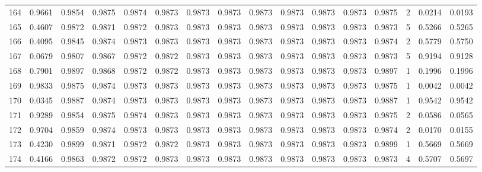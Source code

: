 \begin{tabular}{lrrrrrrrrrrrrrrr}
164 &      0.9661 &  0.9854 &  0.9875 &  0.9874 &  0.9873 &  0.9873 &  0.9873 &  0.9873 &  0.9873 &  0.9873 &   0.9873 &     0.9875 &      2 &                    0.0214 &                     0.0193 \\
165 &      0.4607 &  0.9872 &  0.9871 &  0.9872 &  0.9873 &  0.9873 &  0.9873 &  0.9873 &  0.9873 &  0.9873 &   0.9873 &     0.9873 &      5 &                    0.5266 &                     0.5265 \\
166 &      0.4095 &  0.9845 &  0.9874 &  0.9873 &  0.9873 &  0.9873 &  0.9873 &  0.9873 &  0.9873 &  0.9873 &   0.9873 &     0.9874 &      2 &                    0.5779 &                     0.5750 \\
167 &      0.0679 &  0.9807 &  0.9867 &  0.9872 &  0.9872 &  0.9873 &  0.9873 &  0.9873 &  0.9873 &  0.9873 &   0.9873 &     0.9873 &      5 &                    0.9194 &                     0.9128 \\
168 &      0.7901 &  0.9897 &  0.9868 &  0.9872 &  0.9872 &  0.9873 &  0.9873 &  0.9873 &  0.9873 &  0.9873 &   0.9873 &     0.9897 &      1 &                    0.1996 &                     0.1996 \\
169 &      0.9833 &  0.9875 &  0.9874 &  0.9873 &  0.9873 &  0.9873 &  0.9873 &  0.9873 &  0.9873 &  0.9873 &   0.9873 &     0.9875 &      1 &                    0.0042 &                     0.0042 \\
170 &      0.0345 &  0.9887 &  0.9874 &  0.9873 &  0.9873 &  0.9873 &  0.9873 &  0.9873 &  0.9873 &  0.9873 &   0.9873 &     0.9887 &      1 &                    0.9542 &                     0.9542 \\
171 &      0.9289 &  0.9854 &  0.9875 &  0.9874 &  0.9873 &  0.9873 &  0.9873 &  0.9873 &  0.9873 &  0.9873 &   0.9873 &     0.9875 &      2 &                    0.0586 &                     0.0565 \\
172 &      0.9704 &  0.9859 &  0.9874 &  0.9873 &  0.9873 &  0.9873 &  0.9873 &  0.9873 &  0.9873 &  0.9873 &   0.9873 &     0.9874 &      2 &                    0.0170 &                     0.0155 \\
173 &      0.4230 &  0.9899 &  0.9871 &  0.9872 &  0.9872 &  0.9873 &  0.9873 &  0.9873 &  0.9873 &  0.9873 &   0.9873 &     0.9899 &      1 &                    0.5669 &                     0.5669 \\
174 &      0.4166 &  0.9863 &  0.9872 &  0.9872 &  0.9873 &  0.9873 &  0.9873 &  0.9873 &  0.9873 &  0.9873 &   0.9873 &     0.9873 &      4 &                    0.5707 &                     0.5697 \\

\end{tabular}
